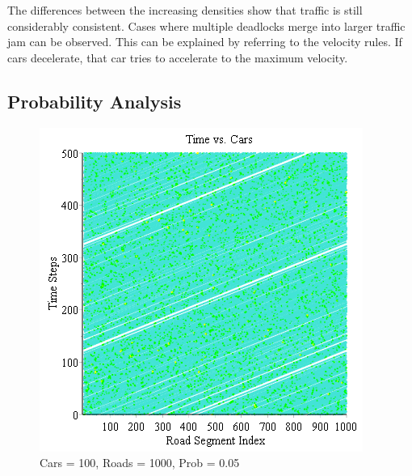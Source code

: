 \documentclass[12pt]{extarticle}
\begin{document}
The differences between the increasing densities show that traffic is still considerably consistent. Cases where multiple deadlocks merge into larger traffic jam can be observed. This can be explained by referring to the velocity rules. If cars decelerate, that car tries to accelerate to the maximum velocity. 

\subsection{Probability Analysis}
\begin{figure}[h!]
	\centering
	\includegraphics[scale=0.70]{Graph4.png}
	\caption{Cars = 100, Roads = 1000, Prob = 0.05}
	\label{fig:img4}
\end{figure}
\end{document}
